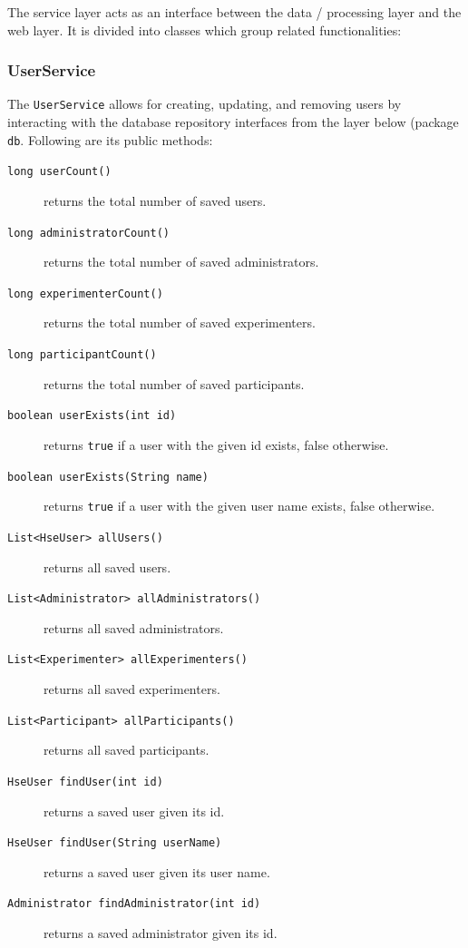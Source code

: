 \documentclass[a4paper]{usiinfbachelorproject}
\begin{document}
The service layer acts as an interface between the data / processing layer and the web layer. It is
 divided into classes which group related functionalities:

\subsubsection{\textbf{UserService}}

The \texttt{UserService} allows for creating, updating, and removing users by interacting with the database repository interfaces
from the layer below (package \texttt{db}. Following are its public methods:
 
    \begin{description}

        \item[\texttt{long userCount()}] returns the total number of saved users.
        \item[\texttt{long administratorCount()}] returns the total number of saved administrators.
        \item[\texttt{long experimenterCount()}] returns the total number of saved experimenters.
        \item[\texttt{long participantCount()}] returns the total number of saved participants.
        \item[\texttt{boolean userExists(int id)}] returns \texttt{true} if a user with the given id exists, false otherwise.
        \item[\texttt{boolean userExists(String name)}] returns \texttt{true} if a user with the given user name exists, false otherwise.
        \item[\texttt{List<HseUser> allUsers()}] returns all saved users.
        \item[\texttt{List<Administrator> allAdministrators()}] returns all saved administrators.
        \item[\texttt{List<Experimenter> allExperimenters()}] returns all saved experimenters.
        \item[\texttt{List<Participant> allParticipants()}] returns all saved participants.
        \item[\texttt{HseUser findUser(int id)}] returns a saved user given its id.
        \item[\texttt{HseUser findUser(String userName)}] returns a saved user given its user name.
        \item[\texttt{Administrator findAdministrator(int id)}] returns a saved administrator given its id.

\end{description}
\end{document}
